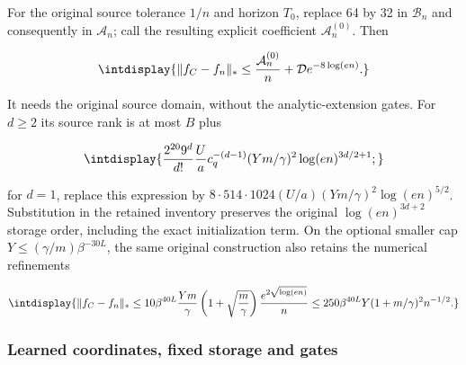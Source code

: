 \label{int:compact-original-tolerance-specialization}
\label{int:harmonic-original-tolerance-specialization}
For the original source tolerance \(1/n\) and horizon \(T_0\), replace 64 by 32 in \(\mathcal B_n\) and consequently in \(\mathcal A_n\); call the resulting explicit coefficient \(\mathcal A_n^{(0)}\). Then


\begingroup\renewcommand{\theHequation}{intdisplay.190}
\begin{equation}
\intdisplay{
\|f_C-f_n\|_*\le\frac{\mathcal A_n^{(0)}}n
                    +\mathcal D e^{-8\log(en)}.
}
\label{int:eq-0079-harmonic-original-tolerance-specialization}
\end{equation}
\endgroup


It needs the original source domain, without the analytic-extension gates. For \(d\ge2\) its source rank is at most \(B\) plus


\begingroup\renewcommand{\theHequation}{intdisplay.191}
\begin{equation*}
\intdisplay{
\frac{2^{20}9^d}{d!}\frac Ua c_q^{-(d-1)}
            (Ym/\gamma)^2\log(en)^{3d/2+1};
}
\end{equation*}
\endgroup


for \(d=1\), replace this expression by \(8\cdot514\cdot1024(U/a)(Ym/\gamma)^2\log(en)^{5/2}\). Substitution in the retained inventory preserves the original \(\log(en)^{3d+2}\) storage order, including the exact initialization term. On the optional smaller cap \(Y\le(\gamma/m)\beta^{-30L}\), the same original construction also retains the numerical refinements


\begingroup\renewcommand{\theHequation}{intdisplay.192}
\begin{equation}
\intdisplay{
\|f_C-f_n\|_*\le10\beta^{40L}\frac{Ym}{\gamma}
  \left(1+\sqrt{\frac m\gamma}\right)\frac{e^{2\sqrt{\log(en)}}}{n}
 \le250\beta^{40L}Y(1+m/\gamma)^2n^{-1/2}.
}
\label{int:eq-0080-harmonic-optional-small-cap-refinement}
\end{equation}
\endgroup

\subsubsection{Learned coordinates, fixed storage and gates}
\label{int:compact-storage-count}
\label{int:harmonic-storage-count}

